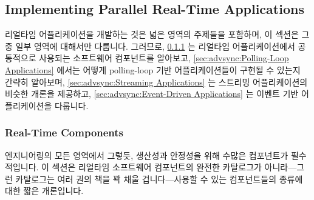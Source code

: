 \subsection{Implementing Parallel Real-Time Applications}
\label{sec:advsync:Implementing Parallel Real-Time Applications}

리얼타임 어플리케이션을 개발하는 것은 넓은 영역의 주제들을 포함하며, 이 섹션은
그 중 일부 영역에 대해서만 다룹니다.
그러므로,
\cref{sec:advsync:Real-Time Components}
는 리얼타임 어플리케이션에서 공통적으로 사용되는 소프트웨어 컴포넌트를
알아보고,
\cref{sec:advsync:Polling-Loop Applications}
에서는 어떻게 polling-loop 기반 어플리케이션들이 구현될 수 있는지 간략히
알아보며,
\cref{sec:advsync:Streaming Applications}
는 스트리밍 어플리케이션의 비슷한 개론을 제공하고,
\cref{sec:advsync:Event-Driven Applications}
는 이벤트 기반 어플리케이션을 다룹니다.

\subsubsection{Real-Time Components}
\label{sec:advsync:Real-Time Components}

엔지니어링의 모든 영역에서 그렇듯, 생산성과 안정성을 위해 수많은 컴포넌트가
필수적입니다.
이 섹션은 리얼타임 소프트웨어 컴포넌트의 완전한 카탈로그가 아니라---그런
카탈로그는 여러 권의 책을 꽉 채울 겁니다---사용할 수 있는 컴포넌트들의 종류에
대한 짧은 개론입니다.

